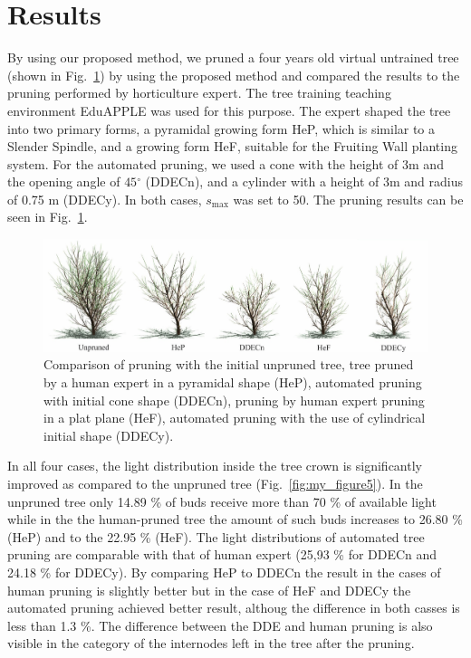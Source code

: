 \documentclass[1p]{elsarticle}
\begin{document}
\section{Results}
By using our proposed method, we pruned a four years old virtual
untrained tree (shown in Fig.~\ref{fig:my_figure4}) by using the proposed method and
compared the results to the pruning performed by horticulture expert.
The tree training teaching environment EduAPPLE \cite{kohek_eduapple:_2015} was used for
this purpose. The expert shaped the tree into two primary forms, a
pyramidal growing form HeP, which is similar to a Slender Spindle, and a
growing form HeF, suitable for the Fruiting Wall planting system. For
the automated pruning, we used a cone with the height of \(3\)m and the
opening angle of \(45{^\circ}\) (DDECn), and a cylinder with a height of
3m and radius of 0.75 m (DDECy). In both cases, \(s_{\mathrm{\max}}\)
was set to 50. The pruning results can be seen in Fig.~\ref{fig:my_figure4}.
\begin{figure}[hbt]
    \centering
    \includegraphics[width=5.4in]{figs/image4.jpeg}
    \caption{Comparison of pruning with the initial unpruned tree,
tree pruned by a human expert in a pyramidal shape (HeP), automated
pruning with initial cone shape (DDECn), pruning by human expert pruning
in a plat plane (HeF), automated pruning with the use of cylindrical
initial shape (DDECy).}
    \label{fig:my_figure4}
\end{figure}

In all four cases, the light distribution inside the tree crown is
significantly improved as compared to the unpruned tree (Fig.~\ref{fig:my_figure5}). In the unpruned
tree only 14.89 \% of buds receive more than 70 \% of available light while in the the human-pruned tree the amount of such buds increases to 26.80 \% (HeP) and to the 22.95 \% (HeF).
The light distributions of automated tree pruning are comparable with
that of human expert (25,93 \% for DDECn and 24.18 \% for DDECy). By comparing HeP to DDECn the result in the cases of human pruning is slightly better but in the case of HeF and DDECy the automated pruning achieved better result, althoug the difference in both casses is less than 1.3 \%. The difference between the DDE
and human pruning is also visible in the category of the internodes left
in the tree after the pruning.
\end{document}
